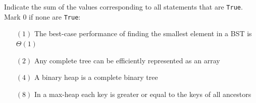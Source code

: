 \documentclass[12pt,addpoints]{exam}
\begin{document}
\begin{questions}
\question[5] 
Indicate the sum of the values corresponding to all statements that are \verb|True|.  Mark $0$ if none are \verb|True|:
\begin{itemize}
	\item[$(1)$] The best-case performance of finding the smallest element in a BST is $\Theta(1)$
	\item[$(2)$] Any complete tree can be efficiently represented as an array
	\item[$(4)$] A binary heap is a complete binary tree
	\item[$(8)$] In a max-heap each key is greater or equal to the keys of all ancestors\end{itemize}
\answerline

\end{questions}
\end{document}
